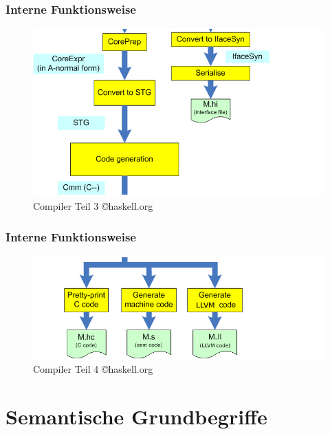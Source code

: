 \begin{frame}
\frametitle{Interne Funktionsweise}
\begin{figure}
\centering
\includegraphics[scale=0.4]{images/HscPipe2_3.png}
\caption{Compiler Teil 3 \copyright haskell.org}
\end{figure}
\end{frame}

\begin{frame}
\frametitle{Interne Funktionsweise}
\begin{figure}
\centering
\includegraphics[scale=0.4]{images/HscPipe2_4.png}
\caption{Compiler Teil 4 \copyright haskell.org}
\end{figure}
\end{frame}

\section{Semantische Grundbegriffe}

